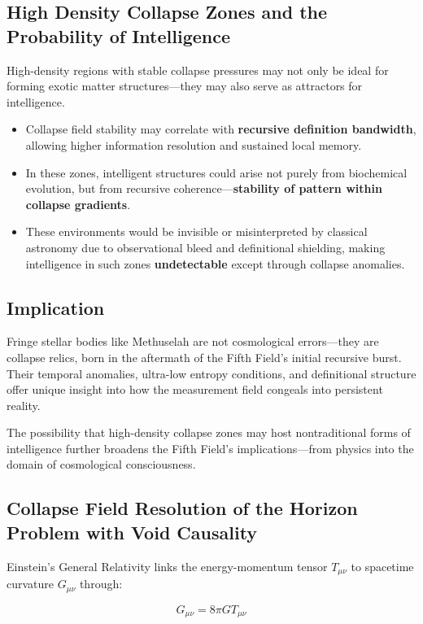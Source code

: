 \subsection{High Density Collapse Zones and the Probability of Intelligence}
High-density regions with stable collapse pressures may not only be ideal for forming exotic matter structures—they may also serve as attractors for intelligence.

\begin{itemize}
  \item Collapse field stability may correlate with \textbf{recursive definition bandwidth}, allowing higher information resolution and sustained local memory.
  \item In these zones, intelligent structures could arise not purely from biochemical evolution, but from recursive coherence—\textbf{stability of pattern within collapse gradients}.
  \item These environments would be invisible or misinterpreted by classical astronomy due to observational bleed and definitional shielding, making intelligence in such zones \textbf{undetectable} except through collapse anomalies.
\end{itemize}

\subsection{Implication}
Fringe stellar bodies like Methuselah are not cosmological errors—they are collapse relics, born in the aftermath of the Fifth Field's initial recursive burst. Their temporal anomalies, ultra-low entropy conditions, and definitional structure offer unique insight into how the measurement field congeals into persistent reality.

The possibility that high-density collapse zones may host nontraditional forms of intelligence further broadens the Fifth Field’s implications—from physics into the domain of cosmological consciousness.

\subsection{Collapse Field Resolution of the Horizon Problem with Void Causality}

Einstein's General Relativity links the energy-momentum tensor \( T_{\mu\nu} \) to spacetime curvature \( G_{\mu\nu} \) through:

\[ G_{\mu\nu} = 8\pi G T_{\mu\nu} \]

